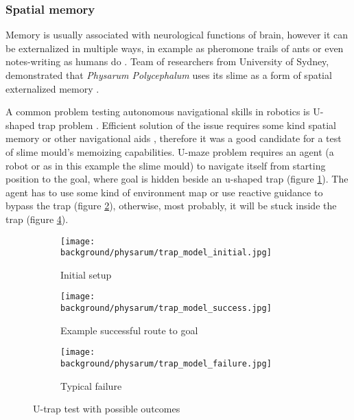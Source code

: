 \subsubsection{Spatial memory}

Memory is usually associated with neurological functions of brain, however it can be externalized in multiple ways, in example as pheromone trails of ants \cite{carroll1973ecology} or even notes-writing as humans do \cite{fisher1973effect}. Team of researchers from University of Sydney, demonstrated that \textit{Physarum Polycephalum} uses its slime as a form of spatial externalized memory \cite{reid2012slime}.

A common problem testing autonomous navigational skills in robotics is U-shaped trap problem \cite{chatterjee2001use}. Efficient solution of the issue requires some kind spatial memory or other navigational aids \cite{balch1993avoiding}, therefore it was a good candidate for a test of slime mould's memoizing capabilities. U-maze problem requires an agent (a robot or as in this example the slime mould) to navigate itself from starting position to the goal, where goal is hidden beside an u-shaped trap (figure \ref{figure:bp_trap_model}). The agent has to use some kind of environment map or use reactive guidance to bypass the trap (figure \ref{figure:bp_trap_model_success}), otherwise, most probably, it will be stuck inside the trap (figure \ref{figure:bp_trap_model_failure}).

\begin{figure}
  \centering
  \begin{subfigure}{0.45\textwidth}
    \centering
    \texttt{[image: background/physarum/trap\_model\_initial.jpg]}
    \caption{Initial setup}
    \label{figure:bp_trap_model}
  \end{subfigure}
  \begin{subfigure}{0.45\textwidth}
    \centering
    \texttt{[image: background/physarum/trap\_model\_success.jpg]}
    \caption{Example successful route to goal}
    \label{figure:bp_trap_model_success}
  \end{subfigure}
  \begin{subfigure}{0.45\textwidth}
    \centering
    \texttt{[image: background/physarum/trap\_model\_failure.jpg]}
    \caption{Typical failure}
    \label{figure:bp_trap_model_failure}
  \end{subfigure}
  \caption{U-trap test with possible outcomes}
\end{figure}

